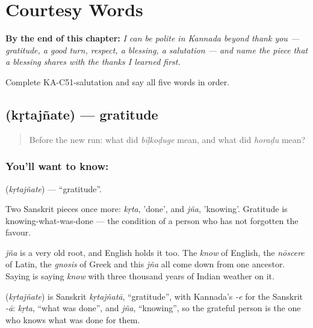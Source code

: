 
\chapter{Courtesy Words}
\label{ch:ka-courtesy}

\begin{chapteropening}
\textbf{By the end of this chapter:} \emph{I can be polite in Kannada beyond thank you --- gratitude, a good turn, respect, a blessing, a salutation --- and name the piece that a blessing shares with the thanks I learned first.}

Complete KA-C51-salutation and say all five words in order.
\end{chapteropening}

\section[\texorpdfstring{\kn{ಕೃತಜ್ಞತೆ} (kṛtajñate)}{ಕೃತಜ್ಞತೆ (kṛtajñate)}]{ (kṛtajñate) — gratitude}

\label{lesson:KA-C51-gratitude}



\begin{quote}
Before the new run: what did \emph{bīḷkoḍuge} mean, and what did \emph{horaḍu} mean?
\end{quote}

\subsection*{You'll want to know: }
\textbf{} (\emph{kṛtajñate}) — \textquotedblleft{}gratitude\textquotedblright{}.

Two Sanskrit pieces once more: \emph{kṛta}, 'done', and \emph{jña}, 'knowing'. Gratitude is knowing-what-was-done — the condition of a person who has not forgotten the favour.

\emph{jña} is a very old root, and English holds it too. The \emph{know} of English, the \emph{nōscere} of Latin, the \emph{gnosis} of Greek and this \emph{jña} all come down from one ancestor. Saying  is saying \emph{know} with three thousand years of Indian weather on it.

\begin{cousinweb}
\textbf{} (\emph{kṛtajñate}) is Sanskrit \emph{kṛtajñatā}, \textquotedblleft{}gratitude\textquotedblright{}, with Kannada's \emph{-e} for the Sanskrit \emph{-ā}: \emph{kṛta}, \textquotedblleft{}what was done\textquotedblright{}, and \emph{jña}, \textquotedblleft{}knowing\textquotedblright{}, so the grateful person is the one who knows what was done for them.
\end{cousinweb}

